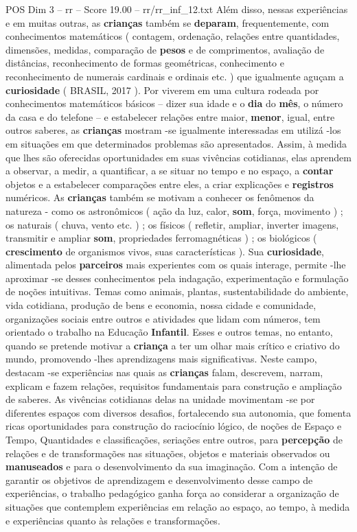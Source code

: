 \begin{textsample}{POS Dim 3 – rr – Score 19.00 – rr/rr\_inf\_12.txt}
Além disso, nessas experiências e em muitas outras, as \textbf{crianças} também se \textbf{deparam}, frequentemente, com conhecimentos matemáticos ( contagem, ordenação, relações entre quantidades, dimensões, medidas, comparação de \textbf{pesos} e de comprimentos, avaliação de distâncias, reconhecimento de formas geométricas, conhecimento e reconhecimento de numerais cardinais e ordinais etc. ) que igualmente aguçam a \textbf{curiosidade} ( BRASIL, 2017 ).
Por viverem em uma cultura rodeada por conhecimentos matemáticos básicos – dizer sua idade e o \textbf{dia} do \textbf{mês}, o número da casa e do telefone – e estabelecer relações entre maior, \textbf{menor}, igual, entre outros saberes, as \textbf{crianças} mostram -se igualmente interessadas em utilizá -los em situações em que determinados problemas são apresentados.
Assim, à medida que lhes são oferecidas oportunidades em suas vivências cotidianas, elas aprendem a observar, a medir, a quantificar, a se situar no tempo e no espaço, a \textbf{contar} objetos e a estabelecer comparações entre eles, a criar explicações e \textbf{registros} numéricos.
As \textbf{crianças} também se motivam a conhecer os fenômenos da natureza - como os astronômicos ( ação da luz, calor, \textbf{som}, força, movimento ) ; os naturais ( chuva, vento etc. ) ; os físicos ( refletir, ampliar, inverter imagens, transmitir e ampliar \textbf{som}, propriedades ferromagnéticas ) ; os biológicos ( \textbf{crescimento} de organismos vivos, suas características ).
Sua \textbf{curiosidade}, alimentada pelos \textbf{parceiros} mais experientes com os quais interage, permite -lhe aproximar -se desses conhecimentos pela indagação, experimentação e formulação de noções intuitivas.
Temas como animais, plantas, sustentabilidade do ambiente, vida cotidiana, produção de bens e economia, nossa cidade e comunidade, organizações sociais entre outros e atividades que lidam com números, tem orientado o trabalho na Educação \textbf{Infantil}.
Esses e outros temas, no entanto, quando se pretende motivar a \textbf{criança} a ter um olhar mais crítico e criativo do mundo, promovendo -lhes aprendizagens mais significativas.
Neste campo, destacam -se experiências nas quais as \textbf{crianças} falam, descrevem, narram, explicam e fazem relações, requisitos fundamentais para construção e ampliação de saberes.
As vivências cotidianas delas na unidade movimentam -se por diferentes espaços com diversos desafios, fortalecendo sua autonomia, que fomenta ricas oportunidades para construção do raciocínio lógico, de noções de Espaço e Tempo, Quantidades e classificações, seriações entre outros, para \textbf{percepção} de relações e de transformações nas situações, objetos e materiais observados ou \textbf{manuseados} e para o desenvolvimento da sua imaginação.
Com a intenção de garantir os objetivos de aprendizagem e desenvolvimento desse campo de experiências, o trabalho pedagógico ganha força ao considerar a organização de situações que contemplem experiências em relação ao espaço, ao tempo, à medida e experiências quanto às relações e transformações.

\end{textsample}
